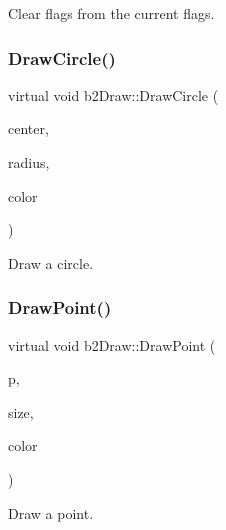 Clear flags from the current flags. 

\mbox{\label{classb2_draw_ae2effe9bca87c8d7cb90e860d13b7e9e}} 
\subsubsection{\texorpdfstring{DrawCircle()}{DrawCircle()}}
{\footnotesize\ttfamily virtual void b2\+Draw\+::\+Draw\+Circle (\begin{DoxyParamCaption}\item[{const \mbox{\hyperlink{structb2_vec2}{b2\+Vec2}} \&}]{center,  }\item[{\mbox{\hyperlink{b2_settings_8h_aacdc525d6f7bddb3ae95d5c311bd06a1}{float32}}}]{radius,  }\item[{const \mbox{\hyperlink{structb2_color}{b2\+Color}} \&}]{color }\end{DoxyParamCaption})\hspace{0.3cm}{\ttfamily [pure virtual]}}



Draw a circle. 

\mbox{\label{classb2_draw_acc83934a18c276d4391296c4968d9e16}} 
\subsubsection{\texorpdfstring{DrawPoint()}{DrawPoint()}}
{\footnotesize\ttfamily virtual void b2\+Draw\+::\+Draw\+Point (\begin{DoxyParamCaption}\item[{const \mbox{\hyperlink{structb2_vec2}{b2\+Vec2}} \&}]{p,  }\item[{\mbox{\hyperlink{b2_settings_8h_aacdc525d6f7bddb3ae95d5c311bd06a1}{float32}}}]{size,  }\item[{const \mbox{\hyperlink{structb2_color}{b2\+Color}} \&}]{color }\end{DoxyParamCaption})\hspace{0.3cm}{\ttfamily [pure virtual]}}



Draw a point. 

\mbox{\label{classb2_draw_acd5427d1d2e7d19f1b34ad3620134d28}} 
